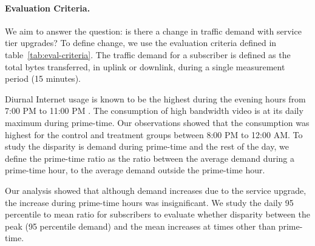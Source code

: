 \paragraph{Evaluation Criteria. } We aim to answer the question: is there a 
change in traffic demand with service tier upgrades? To define change, we use 
the evaluation criteria defined in table~\ref{tab:eval-criteria}. The traffic 
demand for a subscriber is defined as the total bytes transferred, in 
uplink or downlink, during a single measurement period (15 minutes).

Diurnal Internet usage is known to be the highest during the evening hours from 
7:00 PM to 11:00 PM \cite{fcc2015broadband-report}. The consumption of high 
bandwidth video is at its daily maximum during prime-time. Our observations 
showed that the consumption was highest for the control and treatment groups 
between 8:00 PM to 12:00 AM. To study the disparity is demand during prime-time 
and the rest of the day, we define the prime-time ratio as the ratio between 
the average demand during a prime-time hour, to the average demand outside the 
prime-time hour.

Our analysis showed that although demand increases due to the service upgrade, 
the increase during prime-time hours was insignificant. We study the daily 95 
percentile to mean ratio for subscribers to evaluate whether disparity between 
the peak (95 percentile demand) and the mean increases at times other than 
prime-time.







